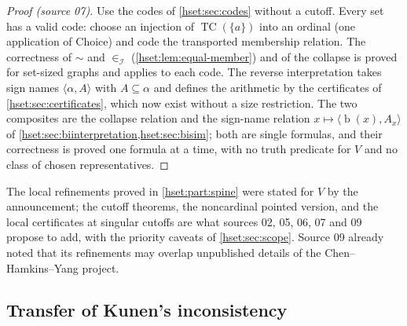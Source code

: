 \documentclass[11pt,letterpaper]{article}
\theoremstyle{definition}
\theoremstyle{remark}
\newcommand{\bd}{\operatorname{b}}
\newcommand{\TC}{\operatorname{TC}}
\newcommand{\I}{\mathcal I}
\begin{document}

\begin{proof}[Proof (source 07)]
Use the codes of \cref{hset:sec:codes} without a cutoff. Every set has a valid
code: choose an injection of $\TC(\{a\})$ into an ordinal (one application of
Choice) and code the transported membership relation. The correctness of
$\sim$ and $\in_\I$ (\cref{hset:lem:equal-member}) and of the collapse is proved
for set-sized graphs and applies to each code. The reverse interpretation takes
sign names $\langle\alpha,A\rangle$ with $A\subseteq\alpha$ and defines the
arithmetic by the certificates of \cref{hset:sec:certificates}, which now exist
without a size restriction. The two composites are the collapse relation and the
sign-name relation $x\mapsto\langle\bd(x),A_x\rangle$ of
\cref{hset:sec:biinterpretation,hset:sec:bisim}; both are single formulas, and
their correctness is proved one formula at a time, with no truth predicate for
$V$ and no class of chosen representatives.
\end{proof}

The local refinements proved in \cref{hset:part:spine} were stated for $V$ by
the announcement; the cutoff theorems, the noncardinal pointed version, and the
local certificates at singular cutoffs are what sources 02, 05, 06, 07 and 09
propose to add, with the priority caveats of \cref{hset:sec:scope}. Source 09
already noted that its refinements may overlap unpublished details of the
Chen--Hamkins--Yang project.

\subsection{Transfer of Kunen's inconsistency}
\label{hset:sub:kunen}
\end{document}
